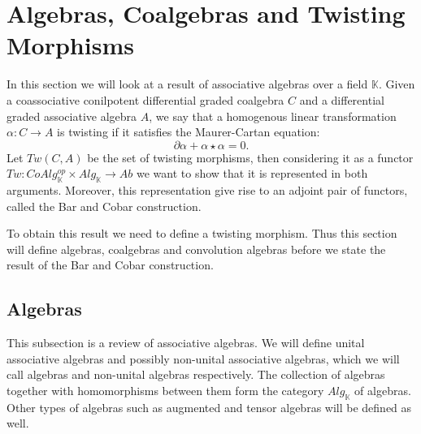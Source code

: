 \documentclass[../thesis.tex]{subfiles}
\begin{document}
    \section{Algebras, Coalgebras and Twisting Morphisms}

        In this section we will look at a result of associative algebras over a field $\mathbb{K}$. Given a coassociative conilpotent differential graded coalgebra $C$ and a differential graded associative algebra $A$, we say that a homogenous linear transformation $\alpha: C\rightarrow A$ is twisting if it satisfies the Maurer-Cartan equation:
            \begin{equation*}
                \partial\alpha + \alpha\star\alpha = 0.
            \end{equation*}
        Let $Tw(C,A)$ be the set of twisting morphisms, then considering it as a functor $Tw : CoAlg_{\mathbb{K}}^{op}\times Alg_{\mathbb{K}} \rightarrow Ab$ we want to show that it is represented in both arguments. Moreover, this representation give rise to an adjoint pair of functors, called the Bar and Cobar construction.

            \begin{center}
            \end{center}

        To obtain this result we need to define a twisting morphism. Thus this section will define algebras, coalgebras and convolution algebras before we state the result of the Bar and Cobar construction.

        \subsection{Algebras}

            This subsection is a review of associative algebras. We will define unital associative algebras and possibly non-unital associative algebras, which we will call algebras and non-unital algebras respectively. The collection of algebras together with homomorphisms between them form the category $Alg_{\mathbb{K}}$ of algebras. Other types of algebras such as augmented and tensor algebras will be defined as well.
\end{document}
